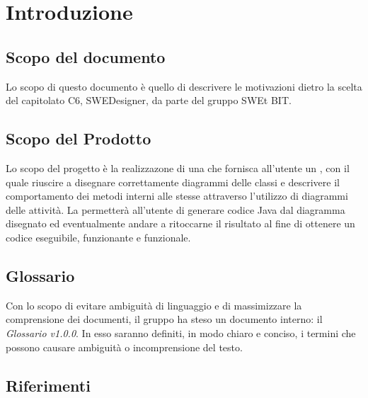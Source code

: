 \section{Introduzione}
  \subsection{Scopo del documento}
          Lo scopo di questo documento è quello di descrivere le motivazioni dietro la scelta del capitolato C6, SWEDesigner, da parte del gruppo SWEt BIT.
  \subsection{Scopo del Prodotto}
          Lo scopo del progetto è la realizzazone di una  che fornisca all'utente un  , con il quale riuscire a disegnare correttamente diagrammi delle classi
          e descrivere il comportamento dei metodi interni alle stesse attraverso l'utilizzo di diagrammi delle attività.
          La  permetterà all'utente di generare codice Java dal diagramma disegnato ed eventualmente andare a ritoccarne il risultato al fine di ottenere un codice
          eseguibile, funzionante e funzionale.
  \subsection{Glossario}
          Con lo scopo di evitare ambiguità di linguaggio e di massimizzare la comprensione dei documenti, il
          gruppo ha steso un documento interno: il \emph{Glossario v1.0.0}. In esso saranno definiti, in modo
          chiaro e conciso, i termini che possono causare ambiguità o incomprensione del testo.
  \subsection{Riferimenti}
